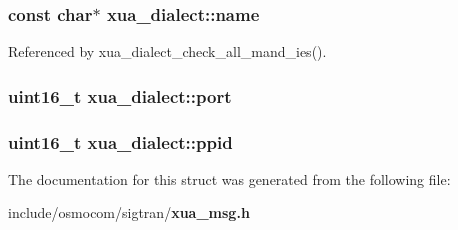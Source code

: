 \subsubsection[{name}]{\setlength{\rightskip}{0pt plus 5cm}const char$\ast$ xua\+\_\+dialect\+::name}\label{structxua__dialect_ad412ff6519d6b8eb8af4d27204e3456b}


Referenced by xua\+\_\+dialect\+\_\+check\+\_\+all\+\_\+mand\+\_\+ies().

\subsubsection[{port}]{\setlength{\rightskip}{0pt plus 5cm}uint16\+\_\+t xua\+\_\+dialect\+::port}\label{structxua__dialect_a15a66733bed59788d292d05dcba82d9f}
\subsubsection[{ppid}]{\setlength{\rightskip}{0pt plus 5cm}uint16\+\_\+t xua\+\_\+dialect\+::ppid}\label{structxua__dialect_a658b4cb0c270a1dea6a1aa1bc2d2b15b}


The documentation for this struct was generated from the following file\+:\begin{DoxyCompactItemize}
\item 
include/osmocom/sigtran/{\bf xua\+\_\+msg.\+h}\end{DoxyCompactItemize}
